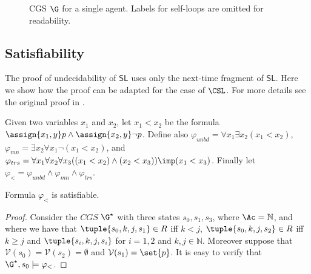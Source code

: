 \begin{figure}[h!]
\centering
{}
\caption{CGS $\G$ for a single agent. Labels for self-loops are omitted for readability.}
\label{fig::hardness}
\end{figure} 

\subsection*{Satisfiability}
The proof of undecidability of $\mathsf{SL}$ \cite{mogavero16} uses only the next-time fragment of $\mathsf{SL}$. Here we show how the proof can be adapted for the case of $\CSL$. For more details see the original proof in \cite{mogavero16}.

Given two variables $x_1$ and $x_2$, let $x_1 < x_2$ be the formula $\assign{x_1,y} p \land \assign{x_2,y}\neg p$. Define also $\varphi_{unbd}= \forall x_1 \exists x_2 (x_1 < x_2)$, $\varphi_{mn}= \exists x_2 \forall x_1 \neg (x_1 < x_2)$, and 
$\varphi_{trs}= \forall x_1 \forall x_2 \forall x_3 ((x_1 < x_2 ) \land  (x_2 < x_3 ))\imp (x_1 < x_3) $. Finally let 
    $\varphi_{<} =\varphi_{unbd}\land \varphi_{mn} \land \varphi_{trs}$. 

   \begin{proposition}
       Formula $\varphi_<$ is satisfiable.
   \end{proposition}
   \begin{proof}
       Consider the $CGS$ $\G^\star$ with three states $s_0,s_1,s_3$, where $\Ac=\mathbb{N}$, and where we have that  $\tuple{s_0,k,j,s_1}\in R$ iff $k < j$, $\tuple{s_0,k,j,s_2}\in R$ iff $k\geq j$ and $\tuple{s_i,k,j,s_i}$ for $i=1,2$ and $k,j\in \mathbb{N}$. Moreover suppose that $\mathcal{V}(s_0)=\mathcal{V}(s_2)=\emptyset$ and $\mathcal{V}(s_1)=\set{p}$. It is easy to verify that $\G^\star,s_0 \models \varphi_<$. 
   \end{proof}

